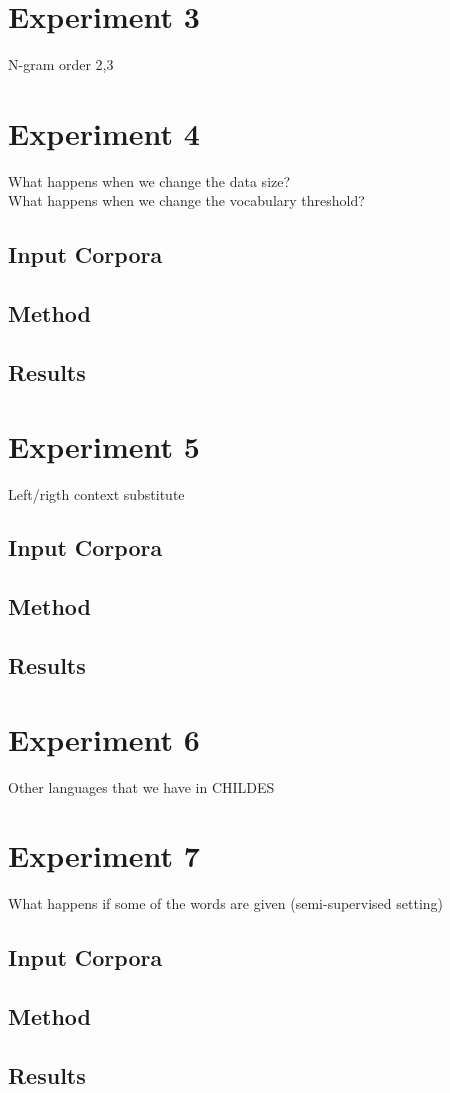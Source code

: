 \section{Experiment 3}
N-gram order 2,3

\section{Experiment 4}
What happens when we change the data size?\\
What happens when we change the vocabulary threshold?\\

\subsection{Input Corpora}
\subsection{Method}
\subsection{Results}

\section{Experiment 5}
Left/rigth context substitute
\subsection{Input Corpora}
\subsection{Method}
\subsection{Results}

\section{Experiment 6}
Other languages that we have in CHILDES

\section{Experiment 7}
What happens if some of the words are given (semi-supervised setting)

\subsection{Input Corpora}
\subsection{Method}
\subsection{Results}


